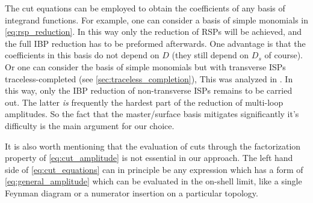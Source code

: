 The cut equations can be employed to obtain the coefficients of any basis of integrand functions. 
For example, one can consider a basis of simple monomials in \cref{eq:rsp_reduction}.
In this way only the reduction of RSPs will be achieved, and the full IBP reduction has to be preformed afterwards.
One advantage is that the coefficients in this basis do not depend on $D$ (they still depend on $D_s$ of course).
Or one can consider the basis of simple monomials but with transverse ISPs traceless-completed (see \cref{sec:traceless_completion}),
This was analyzed in \cite{Mastrolia:2016dhn}.
In this way, only the IBP reduction of non-transverse ISPs remains to be carried out.
The latter \textit{is} frequently the hardest part of the reduction of multi-loop amplitudes. 
So the fact that the master/surface basis mitigates significantly it's difficulty is the main argument for our choice.

It is also worth mentioning that the evaluation of cuts through the 
factorization property of \cref{eq:cut_amplitude} is not essential in our approach. 
The left hand side of \cref{eq:cut_equations} can in principle be any 
expression which has a form of \cref{eq:general_amplitude} which can be evaluated in the on-shell limit,
like a single Feynman diagram or a numerator insertion on a particular topology. 



